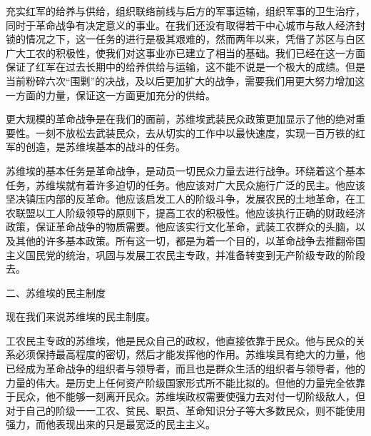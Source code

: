 充实红军的给养与供给，组织联络前线与后方的军事运输，组织军事的卫生治疗，同时于革命战争有决定意义的事业。在我们还没有取得若干中心城市与敌人经济封锁的情况之下，这一任务的进行是极其艰难的，然而两年以来，凭借了苏区与白区广大工农的积极性，使我们对这事业亦已建立了相当的基础。我们已经在这一方面保证了红军在过去长期中的给养供给与运输，这不能不说是一个极大的成绩。但是当前粉碎六次“围剿”的决战，及以后更加扩大的战争，需要我们用更大努力增加这一方面的力量，保证这一方面更加充分的供给。

更大规模的革命战争是在我们的面前，苏维埃武装民众政策更加显示了他的绝对重要性。一刻不放松去武装民众，去从切实的工作中以最快速度，实现一百万铁的红军的创造，是苏维埃基本的战斗的任务。

苏维埃的基本任务是革命战争，是动员一切民众力量去进行战争。环绕着这个基本任务，苏维埃就有着许多迫切的任务。他应该对广大民众施行广泛的民主。他应该坚决镇压内部的反革命。他应该启发工人的阶级斗争，发展农民的土地革命，在工农联盟以工人阶级领导的原则下，提高工农的积极性。他应该执行正确的财政经济政策，保证革命战争的物质需要。他应该实行文化革命，武装工农群众的头脑，以及其他的许多基本政策。所有这一切，都是为着一个目的，以革命战争去推翻帝国主义国民党的统治，巩固与发展工农民主专政，并准备转变到无产阶级专政的阶段去。

二、苏维埃的民主制度

现在我们来说苏维埃的民主制度。

工农民主专政的苏维埃，他是民众自己的政权，他直接依靠于民众。他与民众的关系必须保持最高程度的密切，然后才能发挥他的作用。苏维埃具有绝大的力量，他已经成为革命战争的组织者与领导者，而且也是群众生活的组织者与领导者，他的力量的伟大。是历史上任何资产阶级国家形式所不能比拟的。但他的力量完全依靠于民众，他不能够一刻离开民众。苏维埃政权需要使强力去对付一切阶级敌人，但对于自己的阶级一一工农、贫民、职员、革命知识分子等大多数民众，则不能使用强力，而他表现出来的只是最宽泛的民主主义。

